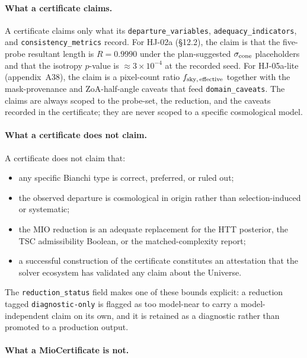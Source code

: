 \paragraph{What a certificate claims.}

A certificate claims only what its
\texttt{departure\_variables},
\texttt{adequacy\_indicators}, and
\texttt{consistency\_metrics} record.  For HJ-02a (§12.2),
the claim is that the five-probe resultant length is
$R=0.9990$ under the plan-suggested $\sigma_{\rm cone}$
placeholders and that the isotropy $p$-value is
$\approx 3 \times 10^{-4}$ at the recorded seed.  For
HJ-05a-lite (appendix~A38), the claim is a pixel-count
ratio $f_{\rm sky,\,effective}$ together with the
mask-provenance and ZoA-half-angle caveats that feed
\texttt{domain\_caveats}.  The claims are always scoped to
the probe-set, the reduction, and the caveats recorded in
the certificate; they are never scoped to a specific
cosmological model.

\paragraph{What a certificate does not claim.}

A certificate does not claim that:

\begin{itemize}
\item any specific Bianchi type is correct, preferred, or
  ruled out;
\item the observed departure is cosmological in origin
  rather than selection-induced or systematic;
\item the MIO reduction is an adequate replacement for the
  HTT posterior, the TSC admissibility Boolean, or the
  matched-complexity report;
\item a successful construction of the certificate
  constitutes an attestation that the solver ecosystem has
  validated any claim about the Universe.
\end{itemize}

The \texttt{reduction\_status} field makes one of these
bounds explicit: a reduction tagged
\texttt{diagnostic-only} is flagged as too model-near to
carry a model-independent claim on its own, and it is
retained as a diagnostic rather than promoted to a
production output.

\paragraph{What a MioCertificate is not.}

